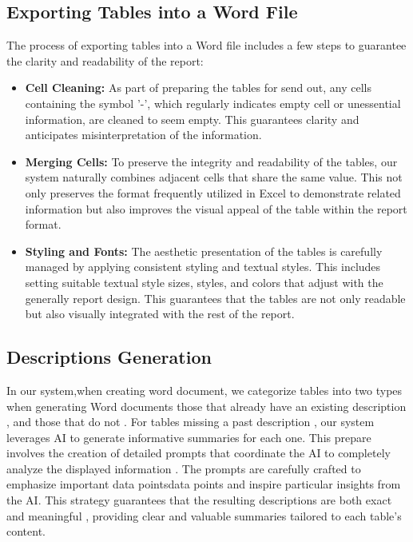 \subsection{Exporting Tables into a Word File}
The process of exporting tables into a Word file includes a few steps to guarantee the clarity and readability of the report:  %
\begin{itemize}
    \item \textbf{Cell Cleaning:} As part of preparing the tables for send out, any cells containing the symbol '-', which regularly indicates empty cell or unessential information, are cleaned to seem empty. This guarantees clarity and anticipates misinterpretation of the information.
    
    \item \textbf{Merging Cells:} To preserve the integrity and readability of the tables, our system naturally combines adjacent cells that share the same value. This not only preserves the format frequently utilized in Excel to demonstrate related information but also improves the visual appeal of the table within the report format.
    
    \item \textbf{Styling and Fonts:} The aesthetic presentation of the tables is carefully managed by applying consistent styling and textual styles. This includes setting suitable textual style sizes, styles, and colors that adjust with the generally report design. This guarantees that the tables are not only readable but also visually integrated with the rest of the report.
\end{itemize}
 
\subsection{Descriptions Generation}
In our system,when creating word document, we categorize tables into two types when generating Word documents those that already have an existing description , and those that do not . For tables missing a past description , our system leverages AI to generate informative summaries for each one. This prepare involves the creation of detailed prompts that coordinate the AI to completely analyze the displayed information . The prompts are carefully crafted to emphasize important data pointsdata points and inspire particular insights from the AI. This strategy guarantees that the resulting descriptions are both exact and meaningful , providing clear and valuable summaries tailored to each table's content.

